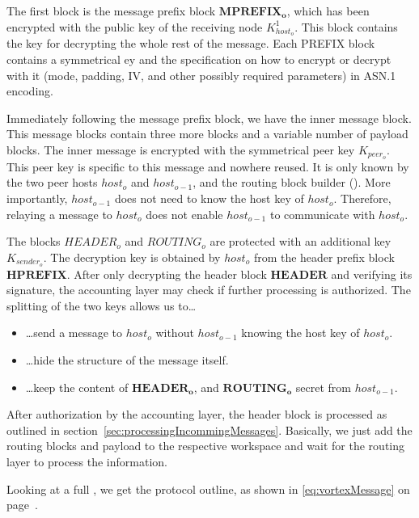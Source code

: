 The first block is the message prefix block $\mathbf{MPREFIX_o}$, which has been encrypted with the public key of the receiving node $K^1_{host_o}$. This block contains the key for decrypting the whole rest of the message. Each PREFIX block contains a symmetrical ey and the specification on how to encrypt or decrypt with it (mode, padding, IV, and other possibly required parameters) in ASN.1 encoding. 

Immediately following the message prefix block, we have the inner message block. This message blocks contain three more blocks and a variable number of payload blocks. The inner message is encrypted with the symmetrical peer key $K_{peer_o}$. This peer key is specific to this message and nowhere reused. It is only known by the two peer hosts $host_o$ and $host_{o-1}$, and the routing block builder (). More importantly, $host_{o-1}$ does not need to know the host key of $host_o$. Therefore, relaying a message to $host_o$ does not enable $host_{o-1}$ to communicate with $host_o$. 

The blocks $HEADER_o$ and $ROUTING_o$ are protected with an additional key $K_{sender_o}$. The decryption key is obtained by $host_o$ from the header prefix block $\mathbf{HPREFIX}$. After only decrypting the header block $\mathbf{HEADER}$ and verifying its signature, the accounting layer may check if further processing is authorized. The splitting of the two keys allows us to\ldots
\begin{itemize}
	\item \ldots send a message to $host_o$ without $host_{o-1}$ knowing the host key of $host_o$.
	\item \ldots hide the structure of the message itself.
	\item \ldots keep the content of $\mathbf{HEADER_o}$, and $\mathbf{ROUTING_o}$ secret from $host_{o-1}$.
\end{itemize}

After authorization by the accounting layer, the header block is processed as outlined in section~\ref{sec:processingIncommingMessages}. Basically, we just add the routing blocks and payload to the respective workspace and wait for the routing layer to process the information.

Looking at a full \VortexMessage, we get the protocol outline, as shown in \eqref{eq:vortexMessage} on page~\pageref{eq:vortexMessage}.

